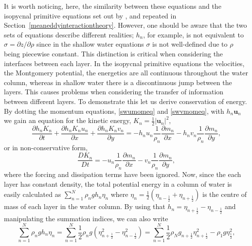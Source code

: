 \documentclass[12pt,a4paper]{report}
\newcommand*\secref[1]{Section~\ref{#1}}
\newcommand*{\half}{\frac{1}{2}}
\begin{document}
   It is worth noticing, here, the similarity between these equations and the isopycnal
    primitive    equations set out by \cite{young2012exact}, and repeated in  \secref{meaneddyinteractiontheory}. However, one should be aware that
    the two sets of equations describe different realities; $h_{n}$, for example, is not
    equivalent to $\sigma = {\partial z}/{\partial \rho}$ since in the shallow water
    equations $\sigma$ is not well-defined due to  $\rho$ being
    piecewise constant. This distinction is critical when considering the interfaces between each
    layer. In the isopycnal primitive equations the velocities, the Montgomery potential, 
    the energetics are all continuous throughout the water column, whereas in shallow 
    water there is a discontinuous jump between the layers. This causes problems when
    considering the transfer of information between different layers. To demonstrate this
    let us derive conservation of energy. By dotting the momentum equations, \ref{swumomeq}
    and \ref{swvmomeq}, with $h_{n}\boldsymbol{u}_{n}$ we gain an equation for the kinetic 
    energy, $K_{n}=\half \left|\boldsymbol{u}_{n}\right|^{2}$,
    \begin{equation}
    \label{swkeeq}
    \frac{\partial h_{n} K_{n}}{\partial t} + \frac{\partial h_{n} K_{n} u_{n}}{\partial x}+
    \frac{\partial h_{n} K_{n} v_{n} }{\partial y} = - h_{n} u_{n}\frac{1}{\rho_{n}}   \frac{\partial m_{n}}{\partial x} - h_{n} v_{n}\frac{1}{\rho_{n}}   \frac{\partial m_{n}}{\partial y},
    \end{equation}
    or in non-conservative form, 
    \begin{equation}
    \frac{D  K_{n}}{D t}  = - u_{n}\frac{1}{\rho_{n}}   \frac{\partial m_{n}}{\partial x} - v_{n}\frac{1}{\rho_{n}}   \frac{\partial m_{n}}{\partial y},
    \end{equation}
    where the forcing and dissipation terms have been ignored. Now, since the
    each layer has constant density, the total potential energy in a column
    of water is easily calculated as $\sum_{n=1}^{N} \rho_{n} g h_{n}\eta_{n}$ where
    $\eta_{n}=\half  \left(\eta_{n-\half }+\eta_{n+\half }\right)$ is
    the centre of mass of each layer in the water column. By using that $h_{n} = \eta_{n+\half }-\eta_{n-\half }$ and manipulating the summation
    indices, we can also write
    \begin{equation*}
    \sum_{n=1}^{N} \rho_{n} g h_{n}\eta_{n} =
        \sum_{n=1}^{N}\half  \rho_{n} g \left(\eta_{n+\half }^{2}-\eta_{n-\half }^{2}\right) =
        \sum_{n=1}^{N}\half  \rho_{N} g_{n+\half } \eta_{n+\half }^{2}-\rho_{1}g\eta_{\half }^{2},
    \end{equation*} 
\end{document}
